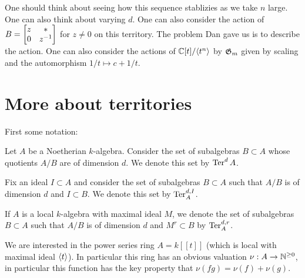 \documentclass[12pt]{article}
\begin{document}
\begin{example}
    One should think about seeing how this sequence stablizies as we take $n$ large. One can also think about varying $d$. One can also consider the 
    action of $B = \begin{bmatrix}
        z & * \\
        0 & {z}^{-1}
    \end{bmatrix}$ for $z\neq 0$ on this territory. The problem Dan gave us is to describe the action. One can also consider the actions
    of $\mathbb{C}[t]/\langle{t^n}\rangle$ by $\mathfrak{G}_m$ given by scaling and the automorphism $1/t\mapsto c + 1/t$.
\end{example}

\newpage

\section{More about territories}

First some notation:

\begin{definition}
    Let $A$ be a Noetherian $k$-algebra. Consider the set of subalgebras $B\subset A$ 
    whose quotients $A/B$ are of dimension $d$.  We denote this set by $\operatorname{Ter}^d A$.
\end{definition}

\begin{definition}

    Fix an ideal $I\subset A$ and consider the set of subalgebras $B\subset A$ such that $A/B$ is of dimension $d$ and $I\subset B$.
    We denote this set by $\operatorname{Ter}^{d,I}_A$.

\end{definition}

\begin{definition}
    If $A$ is a local $k$-algebra with maximal ideal $M$,
    we denote the set of subalgebras $B\subset A$ such that $A/B$ is of dimension $d$ and $M^r\subset B$ by $\operatorname{Ter}^{d,r}_A$.
\end{definition}

We are interested in the power series ring $A = k[[t]]$ (which is local with maximal ideal $\langle{t}\rangle$).
In particular this ring has an obvious valuation $\nu:A\to\mathbb{N}^{\geq 0}$, in particular this function
has the key property that $\nu(fg) = \nu(f) + \nu(g)$.
\end{document}
